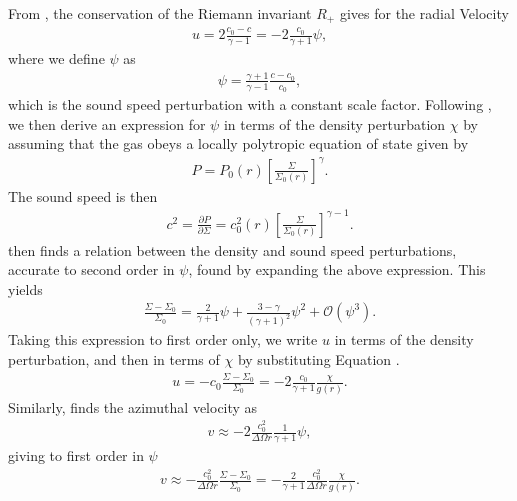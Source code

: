 From \citet{rafikov2002a}, the conservation of the Riemann invariant $R_+$ gives for the radial Velocity
\begin{align}
    u = 2\frac{c_0-c}{\gamma -1}=-2\frac{c_0}{\gamma + 1}\psi,
\end{align}
where we define $\psi$ as
\begin{align}
    \psi = \frac{\gamma+1}{\gamma-1} \frac{c - c_0}{c_0},
\end{align}
which is the sound speed perturbation with a constant scale factor. Following \citet{rafikov2002a}, we then derive an expression for $\psi$ in terms of the density perturbation $\chi$ by assuming that the gas obeys a locally polytropic equation of state given by 
\begin{align}
    P = P_0(r) \left[ \frac{\Sigma}{\Sigma_0(r)} \right]^\gamma. \label{eq:poly_EOS}
\end{align}
The sound speed is then
\begin{align}
    c^2 = \frac{\partial P}{\partial \Sigma} = c_0^2(r) \left[ \frac{\Sigma}{\Sigma_0(r)} \right]^{\gamma-1}.
\end{align}
\citet{rafikov2002a} then finds a relation between the density and sound speed perturbations, accurate to second order in $\psi$, found by expanding the above expression. This yields
\begin{align}
    \frac{\Sigma - \Sigma_0}{\Sigma_0} = \frac{2}{\gamma + 1}\psi + \frac{3 - \gamma}{\left( \gamma + 1  \right)^2} \psi^2 + \mathcal{O}(\psi^3). \label{eq:psi_exp}
\end{align}
Taking this expression to first order only, we write $u$ in terms of the density perturbation, and then in terms of $\chi$ by substituting Equation \feqr. 
\begin{align}
    u = - c_0 \frac{\Sigma - \Sigma_0}{\Sigma_0} = -2 \frac{c_0}{\gamma + 1} \frac{\chi}{g(r)}. \label{eq:ap_rad_vel}
\end{align}
Similarly, \citet{rafikov2002a} finds the azimuthal velocity as
\begin{align}
    v \approx -2 \frac{c_0^2}{\Delta\Omega r} \frac{1}{\gamma + 1} \psi,
\end{align}
giving to first order in $\psi$
\begin{align}
    v \approx - \frac{c_0^2}{\Delta \Omega r} \frac{\Sigma - \Sigma_0}{\Sigma_0} = - \frac{2}{\gamma + 1} \frac{c_0^2}{\Delta \Omega r} \frac{\chi}{g(r)}. \label{eq:ap_az_vel}
\end{align}
